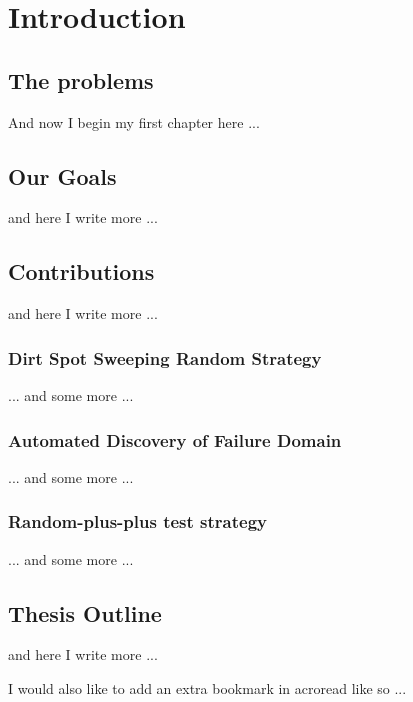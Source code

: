 
\chapter{Introduction}
\ifpdf
    \graphicspath{{Chapter1/Chapter1Figs/PNG/}{Chapter1/Chapter1Figs/PDF/}{Chapter1/Chapter1Figs/}}
\else
    \graphicspath{{Chapter1/Chapter1Figs/EPS/}{Chapter1/Chapter1Figs/}}
\fi

\section{The problems}
And now I begin my first chapter here ...


\section{Our Goals}
and here I write more ...\cite{texbook}


\section{Contributions}
and here I write more ...\cite{texbook}

\subsection{Dirt Spot Sweeping Random Strategy}
... and some more ...

\subsection{Automated Discovery of Failure Domain}
... and some more ...

\subsection{Random-plus-plus test strategy }
... and some more ...

\section{Thesis Outline}
and here I write more ...\cite{texbook}






I would also like to add an extra bookmark in acroread like so ...
\ifpdf
\fi


